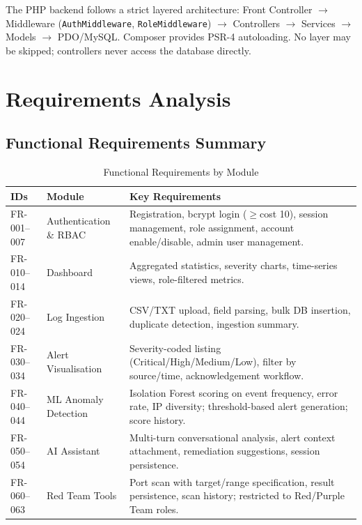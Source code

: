 \documentclass[12pt,a4paper]{article}
\begin{document}
The PHP backend follows a strict layered architecture: Front Controller $\to$
Middleware (\texttt{AuthMiddleware}, \texttt{RoleMiddleware}) $\to$ Controllers
$\to$ Services $\to$ Models $\to$ PDO/MySQL. Composer provides PSR-4 autoloading.
No layer may be skipped; controllers never access the database directly.

\section{Requirements Analysis}

\subsection{Functional Requirements Summary}
\begin{table}[H]
  \centering
  \renewcommand{\arraystretch}{1.25}
  \begin{tabular}{@{}L{1.4cm} L{3.6cm} p{8.6cm}@{}}
    \toprule
    \textbf{IDs} & \textbf{Module} & \textbf{Key Requirements} \\
    \midrule
    FR-001--007
      & Authentication \& RBAC
      & Registration, bcrypt login ($\geq$cost 10), session management,
        role assignment, account enable/disable, admin user management. \\
    FR-010--014
      & Dashboard
      & Aggregated statistics, severity charts, time-series views,
        role-filtered metrics. \\
    FR-020--024
      & Log Ingestion
      & CSV/TXT upload, field parsing, bulk DB insertion,
        duplicate detection, ingestion summary. \\
    FR-030--034
      & Alert Visualisation
      & Severity-coded listing (Critical/High/Medium/Low),
        filter by source/time, acknowledgement workflow. \\
    FR-040--044
      & ML Anomaly Detection
      & Isolation Forest scoring on event frequency, error rate,
        IP diversity; threshold-based alert generation; score history. \\
    FR-050--054
      & AI Assistant
      & Multi-turn conversational analysis, alert context attachment,
        remediation suggestions, session persistence. \\
    FR-060--063
      & Red Team Tools
      & Port scan with target/range specification, result persistence,
        scan history; restricted to Red/Purple Team roles. \\
    \bottomrule
  \end{tabular}
  \caption{Functional Requirements by Module}
\end{table}
\end{document}
